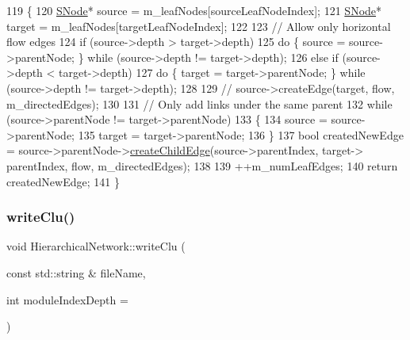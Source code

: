 \begin{DoxyCode}
119 \{
120     \mbox{\hyperlink{classSNode}{SNode}}* source = m\_leafNodes[sourceLeafNodeIndex];
121     \mbox{\hyperlink{classSNode}{SNode}}* target = m\_leafNodes[targetLeafNodeIndex];
122 
123     \textcolor{comment}{// Allow only horizontal flow edges}
124     \textcolor{keywordflow}{if} (source->depth > target->depth)
125         \textcolor{keywordflow}{do} \{ source = source->parentNode; \} \textcolor{keywordflow}{while} (source->depth != target->depth);
126     \textcolor{keywordflow}{else} \textcolor{keywordflow}{if} (source->depth < target->depth)
127         \textcolor{keywordflow}{do} \{ target = target->parentNode; \} \textcolor{keywordflow}{while} (source->depth != target->depth);
128 
129 \textcolor{comment}{//      source->createEdge(target, flow, m\_directedEdges);}
130 
131     \textcolor{comment}{// Only add links under the same parent}
132     \textcolor{keywordflow}{while} (source->parentNode != target->parentNode)
133     \{
134         source = source->parentNode;
135         target = target->parentNode;
136     \}
137     \textcolor{keywordtype}{bool} createdNewEdge = source->parentNode->\mbox{\hyperlink{classSNode_ae6682b903bf066ca1b3d71403f92d9d7}{createChildEdge}}(source->parentIndex, target->
      parentIndex, flow, m\_directedEdges);
138 
139     ++m\_numLeafEdges;
140     \textcolor{keywordflow}{return} createdNewEdge;
141 \}
\end{DoxyCode}
\mbox{\label{classHierarchicalNetwork_a301ba28d5feabede47f09a2fc31b877c}} 
\subsubsection{\texorpdfstring{write\+Clu()}{writeClu()}}
{\footnotesize\ttfamily void Hierarchical\+Network\+::write\+Clu (\begin{DoxyParamCaption}\item[{const std\+::string \&}]{file\+Name,  }\item[{int}]{module\+Index\+Depth = {} }\end{DoxyParamCaption})}

